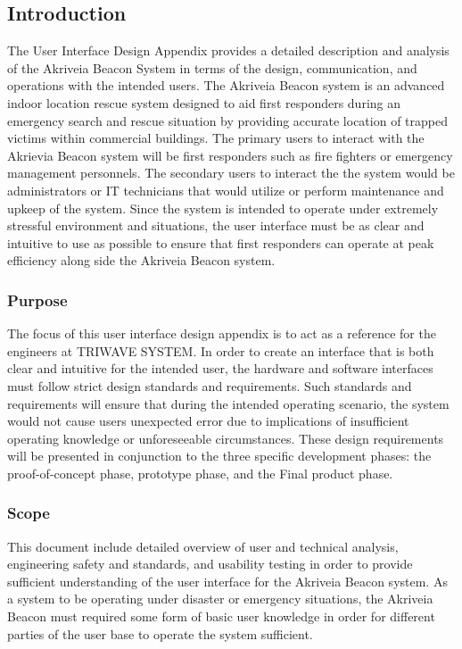 

\subsection{Introduction}
\medskip
The User Interface Design Appendix provides a detailed description and analysis of the Akriveia Beacon System in terms of the design, communication, and operations with the intended users. The Akriveia Beacon system is an advanced indoor location rescue system designed to aid first responders during an emergency search and rescue situation by providing accurate location of trapped victims within commercial buildings. The primary users to interact with the Akrievia Beacon system will be first responders such as fire fighters or emergency management personnels. The secondary users to interact the the system would be administrators or IT technicians that would utilize or perform maintenance and upkeep of the system. Since the system is intended to operate under extremely stressful environment and situations, the user interface must be as clear and intuitive to use as possible to ensure that first responders can operate at peak efficiency along side the Akriveia Beacon system.

\bigskip
\subsubsection{Purpose}
\medskip
The focus of this user interface design appendix is to act as a reference for the engineers at TRIWAVE SYSTEM. In order to create an interface that is both clear and intuitive for the intended user, the hardware and software interfaces must follow strict design standards and requirements. Such standards and requirements will ensure that during the intended operating scenario, the system would not cause users unexpected error due to implications of insufficient operating knowledge or unforeseeable circumstances. These design requirements will be presented in conjunction to the three specific development phases: the proof-of-concept phase, prototype phase, and the Final product phase.

\bigskip
\subsubsection{Scope}
\medskip
This document include detailed overview of user and technical analysis, engineering safety and standards, and usability testing in order to provide sufficient understanding of the user interface for the Akriveia Beacon system. As a system to be operating under disaster or emergency situations, the Akriveia Beacon must required some form of basic user knowledge in order for different parties of the user base to operate the system sufficient.

